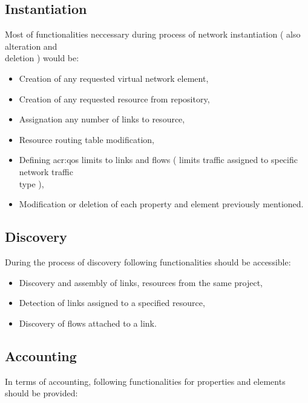 \documentclass[11pt]{book}
\begin{document}
      \subsection{Instantiation}
		\label{sec:req:func:inst}
	  
		Most of functionalities neccessary during process of network instantiation ( also alteration and \\ deletion ) would be:
		
		\begin{itemize}
			\item{Creation of any requested virtual network element, }
			\item{Creation of any requested resource from repository, }
			\item{Assignation any number of links to resource, }
			\item{Resource routing table modification, }
			\item{Defining \gls{acr:qos} limits to links and flows ( limits traffic assigned to specific network traffic \\ type ), }
			\item{Modification or deletion of each property and element previously mentioned. }
		\end{itemize}
		

      \subsection{Discovery}
		\label{sec:req:func:disc}
		
		During the process of discovery following functionalities should be accessible:
		
		\begin{itemize}
			\item{Discovery and assembly of links, resources from the same project, }
			\item{Detection of links assigned to a specified resource, }
			\item{Discovery of flows attached to a link. }
		\end{itemize}


      \subsection{Accounting}  %
		\label{sec:req:func:acc}
		
		In terms of accounting, following functionalities for properties and elements should be provided:
		
\end{document}
